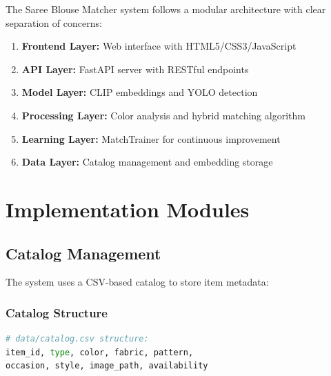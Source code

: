 \documentclass[12pt,a4paper]{report}
\begin{document}

The Saree Blouse Matcher system follows a modular architecture with clear separation of concerns:

\begin{enumerate}
    \item \textbf{Frontend Layer:} Web interface with HTML5/CSS3/JavaScript
    \item \textbf{API Layer:} FastAPI server with RESTful endpoints
    \item \textbf{Model Layer:} CLIP embeddings and YOLO detection
    \item \textbf{Processing Layer:} Color analysis and hybrid matching algorithm
    \item \textbf{Learning Layer:} MatchTrainer for continuous improvement
    \item \textbf{Data Layer:} Catalog management and embedding storage
\end{enumerate}

\section{Implementation Modules}

\subsection{Catalog Management}

The system uses a CSV-based catalog to store item metadata:

\subsubsection{Catalog Structure}

\begin{lstlisting}[language=Python]
# data/catalog.csv structure:
item_id, type, color, fabric, pattern, 
occasion, style, image_path, availability
\end{lstlisting}
\end{document}
